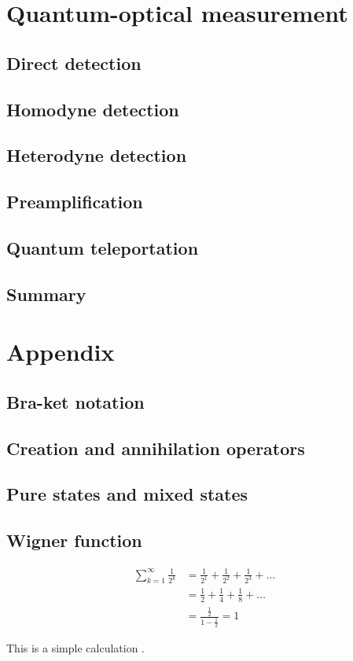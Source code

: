 \documentclass{book}
\begin{document}
\chapter{Quantum-optical measurement}
\section{Direct detection}
\section{Homodyne detection}
\section{Heterodyne detection}
\section{Preamplification}
\section{Quantum teleportation}
\section{Summary}

\appendix
\chapter{Appendix}
\section{Bra-ket notation}
\section{Creation and annihilation operators}
\section{Pure states and mixed states}
\section{Wigner function}

\begin{equation}
\begin{aligned}
  \sum_{k=1}^\infty \frac 1 {2^k} &= \frac 1 {2^1} + \frac 1 {2^2} + \frac 1 {2^3} + \dots \\
  &= \frac{1}{2} + \frac{1}{4} + \frac{1}{8} + \dots \\
  &= \frac{\frac 1 2}{1-\frac 1 2} =  1
\end{aligned}
\end{equation}

This is a simple calculation \cite{adams1995hitchhiker}.



\end{document}
